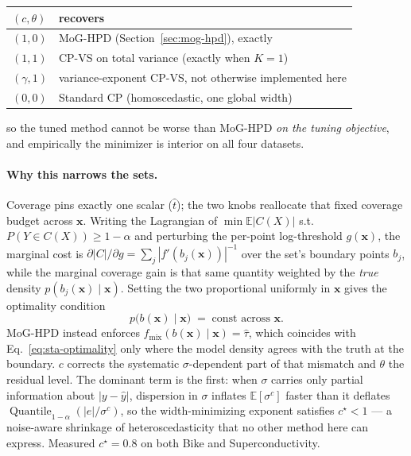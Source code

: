 \documentclass[11pt]{article}
\begin{document}
\begin{center}
\begin{tabular}{@{}ll@{}}
\toprule
$(c,\theta)$ & recovers \\
\midrule
$(1,0)$ & MoG-HPD (Section~\ref{sec:mog-hpd}), exactly \\
$(1,1)$ & CP-VS on total variance (exactly when $K=1$) \\
$(\gamma,1)$ & variance-exponent CP-VS, not otherwise implemented here \\
$(0,0)$ & Standard CP (homoscedastic, one global width) \\
\bottomrule
\end{tabular}
\end{center}

so the tuned method cannot be worse than MoG-HPD \emph{on the tuning objective}, and empirically
the minimizer is interior on all four datasets.

\paragraph{Why this narrows the sets.} Coverage pins exactly one scalar ($\hat t$); the two knobs
reallocate that fixed coverage budget across $\bm x$. Writing the Lagrangian of
$\min \mathbb E|C(X)|$ s.t.\ $P(Y\in C(X))\ge 1-\alpha$ and perturbing the per-point log-threshold
$g(\bm x)$, the marginal cost is $\partial|C|/\partial g=\sum_j |f'(b_j(\bm x))|^{-1}$ over the
set's boundary points $b_j$, while the marginal coverage gain is that same quantity weighted by
the \emph{true} density $p(b_j(\bm x)\mid\bm x)$. Setting the two proportional uniformly in $\bm x$
gives the optimality condition
\begin{equation}
p\big(b(\bm x)\mid\bm x\big) \;=\; \text{const across } \bm x .
\label{eq:sta-optimality}
\end{equation}
MoG-HPD instead enforces $f_{\mathrm{mix}}(b(\bm x)\mid\bm x)=\hat\tau$, which coincides with
Eq.~\eqref{eq:sta-optimality} only where the model density agrees with the truth at the boundary.
$c$ corrects the systematic $\sigma$-dependent part of that mismatch and $\theta$ the residual
level. The dominant term is the first: when $\sigma$ carries only partial information about
$|y-\hat y|$, dispersion in $\sigma$ inflates $\mathbb E[\sigma^c]$ faster than it deflates
$\operatorname{Quantile}_{1-\alpha}(|e|/\sigma^c)$, so the width-minimizing exponent satisfies
$c^\star<1$ --- a noise-aware shrinkage of heteroscedasticity that no other method here can
express. Measured $c^\star=0.8$ on both Bike and Superconductivity.
\end{document}
